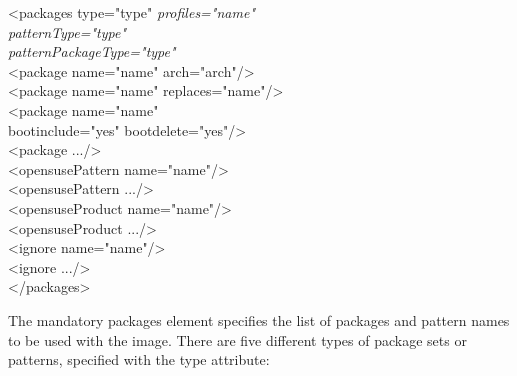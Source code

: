\begin{Command}{12cm}
<packages type="type" \textit{profiles="name"}\\
\hspace*{2.5cm}\textit{patternType="type"}\\
\hspace*{2.5cm}\textit{patternPackageType="type"}\\
\hspace*{1cm}<package name="name" arch="arch"/>\\
\hspace*{1cm}<package name="name" replaces="name"/>\\
\hspace*{1cm}<package name="name"\\
\hspace*{2.5cm}bootinclude="yes" bootdelete="yes"/>\\
\hspace*{1cm}<package .../>\\
\hspace*{1cm}<opensusePattern name="name"/>\\
\hspace*{1cm}<opensusePattern .../>\\
\hspace*{1cm}<opensuseProduct name="name"/>\\
\hspace*{1cm}<opensuseProduct .../>\\
\hspace*{1cm}<ignore name="name"/>\\
\hspace*{1cm}<ignore .../>\\
</packages>
\end{Command}

The mandatory packages element specifies the list of packages and
pattern names to be used with the image. There are five different
types of package sets or patterns, specified with the type attribute:

